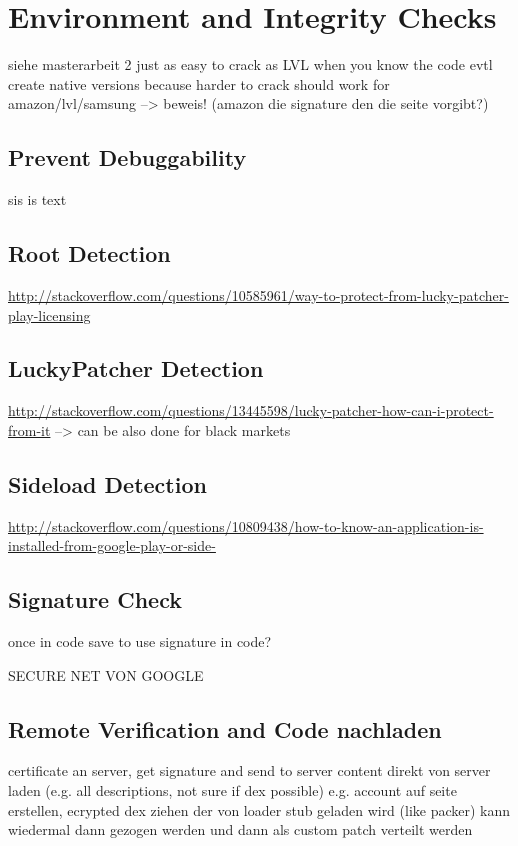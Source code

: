 \section{Environment and Integrity Checks}\label{section:tampering}
siehe masterarbeit 2\newline
just as easy to crack as LVL when you know the code\newline
evtl create native versions because harder to crack\newline
should work for amazon/lvl/samsung --> beweis! (amazon die signature den die seite vorgibt?)\newline


\subsection{Prevent Debuggability}\label{subsection:tampering-debuggable}
sis is text
\subsection{Root Detection}\label{subsection:tampering-root}
\url{http://stackoverflow.com/questions/10585961/way-to-protect-from-lucky-patcher-play-licensing}
\subsection{LuckyPatcher Detection}\label{subsection:tampering-luckypatcher}
\url{http://stackoverflow.com/questions/13445598/lucky-patcher-how-can-i-protect-from-it}\newline
--> can be also done for black markets
\subsection{Sideload Detection}\label{subsection:tampering-sideload}
\url{http://stackoverflow.com/questions/10809438/how-to-know-an-application-is-installed-from-google-play-or-side-}
\subsection{Signature Check}\label{subsection:tampering-signature}
once in code \newline
save to use signature in code?\newline

SECURE NET VON GOOGLE
\subsection{Remote Verification and Code nachladen}\label{subsection:external-remote}
certificate an server, get signature and send to server\newline
content direkt von server laden (e.g. all descriptions, not sure if dex possible)\newline
e.g. account auf seite erstellen, ecrypted dex ziehen der von loader stub geladen wird (like packer)
kann wiedermal dann gezogen werden und dann als custom patch verteilt werden\newline
